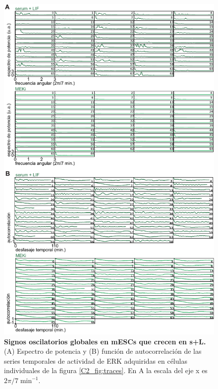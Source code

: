 \documentclass[./main.tex]{subfiles}
\begin{document}
 \begin{figure}
    \centering
    \includegraphics[width=1\columnwidth]{figures/chapter2/C2_FFT_AC.pdf}
    \caption{\textbf{Signos oscilatorios globales en mESCs que crecen en s+L.} (A) Espectro de potencia y (B) función de autocorrelación de las series temporales de actividad de ERK adquiridas en células individuales de la figura \ref{C2_fig:traces}. En A la escala del eje x es $ 2\pi/7\; \text{min}^{-1}$.}
    \label{C2_fig:FFT_AC}
\end{figure}
\end{document}
